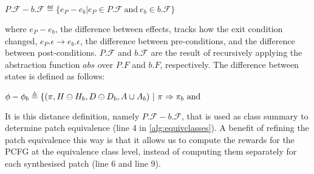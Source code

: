 \centerline{$P.\mathcal{F}-b.\mathcal{F} \eqdef \{e_P - e_b | e_P \in P.\mathcal{F} ~\text{and}~ e_b \in b.\mathcal{F} \}$ }
\noindent where $e_P - e_b$, the difference between effects, tracks how the exit condition changed,  $e_P.\epsilon \rightarrow e_b.\epsilon$, the difference between pre-conditions, and 
the difference between post-conditions. 
$P.\mathcal{F}$ and $b.\mathcal{F}$ are the result of recursively applying the abstraction function $\textit{abs}$ over 
$P.{F}$ and $b.{F}$, respectively.
The difference between states is defined as follows:

\centerline{$\phi - \phi_b \triangleq  \{ (\pi, H \ominus H_b, D \ominus D_b, A \cup A_b)~ |~ \pi \Rightarrow \pi_b ~\text{and}$ }
\qquad{}

It is this distance definition, namely $P.\mathcal{F}-b.\mathcal{F}$, that is used as
class summary to determine patch equivalence (line 4 in \autoref{alg:equivclasses}). 
A benefit of refining the patch equivalence this way is that it allows us to compute the rewards for the PCFG at the equivalence class level, instead of computing them separately for each synthesised patch (line 6 and line 9). 

\setlength{\textfloatsep}{4pt}
